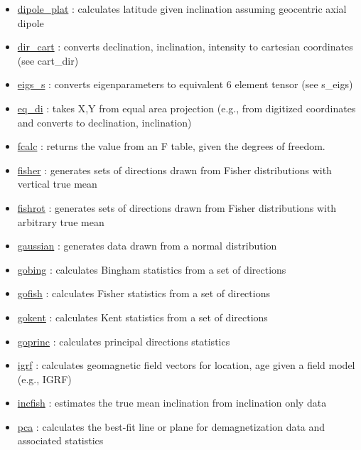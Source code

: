 \documentclass[11pt]{book}
\begin{document}
{{\begin{itemize}
\item \href{http://pmagpy.github.io/PmagPy.html#dipole_plat}{dipole\_plat} : calculates latitude given inclination assuming geocentric axial dipole
\item \href{http://pmagpy.github.io/PmagPy.html#dir_cart}{dir\_cart} : converts declination, inclination, intensity to cartesian coordinates (see cart\_dir)
\item \href{http://pmagpy.github.io/PmagPy.html#eigs_s}{eigs\_s} : converts eigenparameters to equivalent 6 element tensor (see s\_eigs)
\item \href{http://pmagpy.github.io/PmagPy.html#eq_di}{eq\_di} : takes X,Y from equal area projection (e.g., from digitized coordinates and  converts to declination, inclination)
\item \href{http://pmagpy.github.io/PmagPy.html#fcalc}{fcalc} : returns the value from an F table, given the degrees of freedom.
\item \href{http://pmagpy.github.io/PmagPy.html#fisher}{fisher} : generates sets of directions drawn from Fisher distributions with vertical true mean
\item \href{http://pmagpy.github.io/PmagPy.html#fishrot}{fishrot} : generates sets of directions drawn from Fisher distributions with arbitrary true mean
\item \href{http://pmagpy.github.io/PmagPy.html#gaussian}{gaussian} : generates data drawn from a normal distribution
\item \href{http://pmagpy.github.io/PmagPy.html#gobing}{gobing} : calculates Bingham statistics from a set of directions
\item \href{http://pmagpy.github.io/PmagPy.html#gofish}{gofish} : calculates Fisher statistics from a set of directions
\item \href{http://pmagpy.github.io/PmagPy.html#gokent}{gokent} : calculates Kent statistics from a set of directions
\item \href{http://pmagpy.github.io/PmagPy.html#goprinc}{goprinc} : calculates principal directions statistics
\item \href{http://pmagpy.github.io/PmagPy.html#igrf}{igrf} : calculates geomagnetic field vectors for location, age given a field model (e.g., IGRF)
\item \href{http://pmagpy.github.io/PmagPy.html#incfish}{incfish} : estimates the true mean inclination from inclination only data
\item \href{http://pmagpy.github.io/PmagPy.html#pca}{pca} : calculates the best-fit line or plane for demagnetization data and associated statistics

\end{itemize}}}
\end{document}

